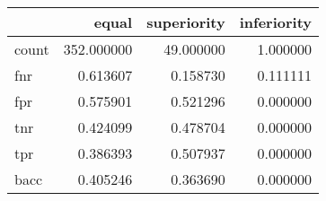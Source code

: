 \begin{tabular}{lrrr}
\toprule
{} &       equal &  superiority &  inferiority \\
\midrule
count &  352.000000 &    49.000000 &     1.000000 \\
fnr   &    0.613607 &     0.158730 &     0.111111 \\
fpr   &    0.575901 &     0.521296 &     0.000000 \\
tnr   &    0.424099 &     0.478704 &     0.000000 \\
tpr   &    0.386393 &     0.507937 &     0.000000 \\
bacc  &    0.405246 &     0.363690 &     0.000000 \\
\bottomrule
\end{tabular}
